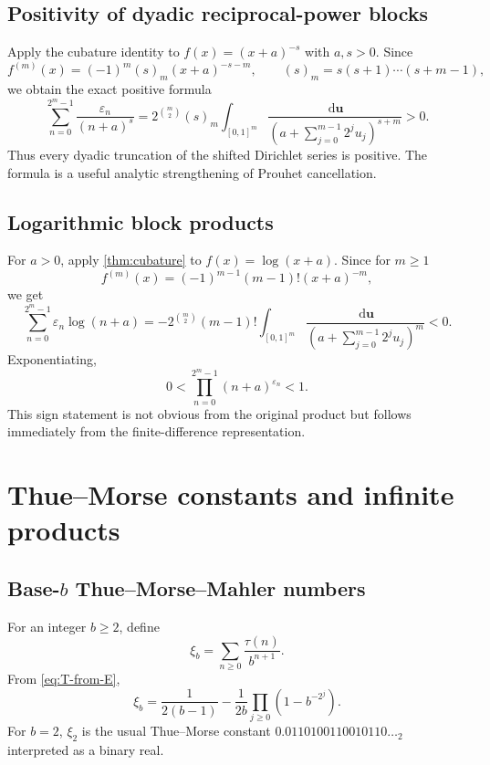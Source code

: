 \documentclass[11pt,oneside]{article}
\theoremstyle{definition}
\theoremstyle{remark}
\newcommand{\dd}{\,\mathrm d}
\newcommand{\eps}{\varepsilon}
\begin{document}
\subsection{Positivity of dyadic reciprocal-power blocks}

Apply the cubature identity to $f(x)=(x+a)^{-s}$ with $a,s>0$.  Since
\[
 f^{(m)}(x)=(-1)^m(s)_m(x+a)^{-s-m},
 \qquad (s)_m=s(s+1)\cdots(s+m-1),
\]
we obtain the exact positive formula
\begin{equation}\label{eq:positive-reciprocal-block}
 \boxed{\quad
 \sum_{n=0}^{2^m-1}\frac{\eps_n}{(n+a)^s}
 =2^{\binom m2}(s)_m
 \int_{[0,1]^m}
 \frac{\dd\mathbf u}
 {(a+\sum_{j=0}^{m-1}2^ju_j)^{s+m}}>0.
 \quad}
\end{equation}
Thus every dyadic truncation of the shifted Dirichlet series is positive.  The
formula is a useful analytic strengthening of Prouhet cancellation.

\subsection{Logarithmic block products}

For $a>0$, apply \cref{thm:cubature} to $f(x)=\log(x+a)$.  Since for $m\ge1$
\[
 f^{(m)}(x)=(-1)^{m-1}(m-1)!(x+a)^{-m},
\]
we get
\begin{equation}\label{eq:finite-log-block}
 \sum_{n=0}^{2^m-1}\eps_n\log(n+a)
 =-2^{\binom m2}(m-1)!
 \int_{[0,1]^m}
 \frac{\dd\mathbf u}
 {(a+\sum_{j=0}^{m-1}2^ju_j)^m}<0.
\end{equation}
Exponentiating,
\begin{equation}\label{eq:finite-product-less-one}
 0<\prod_{n=0}^{2^m-1}(n+a)^{\eps_n}<1.
\end{equation}
This sign statement is not obvious from the original product but follows
immediately from the finite-difference representation.

\section{Thue--Morse constants and infinite products}

\subsection{\texorpdfstring{Base-$b$}{Base-b} Thue--Morse--Mahler numbers}

For an integer $b\ge2$, define
\begin{equation}\label{eq:xi-b-def}
 \xi_b=\sum_{n\ge0}\frac{\tau(n)}{b^{n+1}}.
\end{equation}
From \cref{eq:T-from-E},
\begin{equation}\label{eq:xi-b-product}
 \boxed{\quad
 \xi_b=\frac1{2(b-1)}
 -\frac1{2b}\prod_{j\ge0}\left(1-b^{-2^j}\right).
 \quad}
\end{equation}
For $b=2$, $\xi_2$ is the usual Thue--Morse constant
$0.0110100110010110\ldots_2$ interpreted as a binary real.
\end{document}
